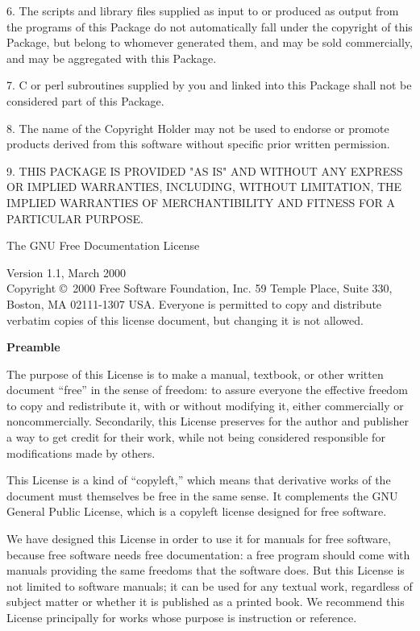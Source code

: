 \documentclass{doc}
\begin{document}
6. The scripts and library files supplied as input to or produced as output from the
programs of this Package do not automatically fall under the copyright of this Package,
but belong to whomever generated them, and may be sold commercially, and may be aggregated
with this Package.

7. C or perl subroutines supplied by you and linked into this Package shall not be
considered part of this Package.

8. The name of the Copyright Holder may not be used to endorse or promote products derived
from this software without specific prior written permission.

9. THIS PACKAGE IS PROVIDED "AS IS" AND WITHOUT ANY EXPRESS OR IMPLIED WARRANTIES,
INCLUDING, WITHOUT LIMITATION, THE IMPLIED WARRANTIES OF MERCHANTIBILITY AND FITNESS FOR A
PARTICULAR PURPOSE.


The GNU Free Documentation License\label{gfdl}

\noindent{}Version 1.1, March 2000\\


 \noindent{}Copyright \copyright\ 2000  Free Software Foundation, Inc.
59 Temple Place, Suite 330, Boston, MA  02111-1307  USA. 
 Everyone is permitted to copy and distribute verbatim copies
 of this license document, but changing it is not allowed.

\noindent\textbf{Preamble}

The purpose of this License is to make a manual, textbook, or other
written document ``free'' in the sense of freedom: to assure everyone
the effective freedom to copy and redistribute it, with or without
modifying it, either commercially or noncommercially.  Secondarily,
this License preserves for the author and publisher a way to get
credit for their work, while not being considered responsible for
modifications made by others.

This License is a kind of ``copyleft,'' which means that derivative
works of the document must themselves be free in the same sense.  It
complements the GNU General Public License, which is a copyleft
license designed for free software.

We have designed this License in order to use it for manuals for free
software, because free software needs free documentation: a free
program should come with manuals providing the same freedoms that the
software does.  But this License is not limited to software manuals;
it can be used for any textual work, regardless of subject matter or
whether it is published as a printed book.  We recommend this License
principally for works whose purpose is instruction or reference.
\end{document}
